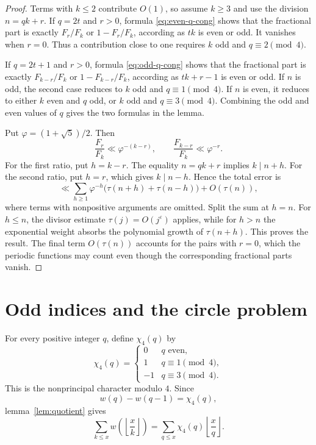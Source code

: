 \documentclass[11pt]{article}
\newcommand{\eps}{\varepsilon}
\begin{document}
\begin{proof}
Terms with $k\leq 2$ contribute $O(1)$, so assume $k\geq 3$ and use
the division $n=qk+r$. If $q=2t$ and $r>0$, formula
\eqref{eq:even-q-cong} shows that the fractional part is exactly
$F_r/F_k$ or $1-F_r/F_k$, according as $tk$ is even or odd. It vanishes
when $r=0$. Thus a contribution close to one requires $k$ odd and
$q\equiv 2\pmod 4$.

If $q=2t+1$ and $r>0$, formula
\eqref{eq:odd-q-cong} shows that the fractional part is exactly
$F_{k-r}/F_k$ or $1-F_{k-r}/F_k$, according as $tk+r-1$ is even or odd.
If $n$ is odd, the second case reduces to $k$ odd and
$q\equiv 1\pmod 4$. If $n$ is even, it reduces to either $k$ even and $q$
odd, or $k$ odd and $q\equiv 3\pmod 4$. Combining the odd and even values
of $q$ gives the two formulas in the lemma.

Put $\varphi=(1+\sqrt5)/2$. Then
\[
 \frac{F_r}{F_k}\ll\varphi^{-(k-r)},\qquad
 \frac{F_{k-r}}{F_k}\ll\varphi^{-r}.
\]
For the first ratio, put $h=k-r$. The equality $n=qk+r$ implies
$k\mid n+h$. For the second ratio, put $h=r$, which gives $k\mid n-h$.
Hence the total error is
\[
 \ll\sum_{h\geq 1}\varphi^{-h}
 \bigl(\tau(n+h)+\tau(n-h)\bigr)+O(\tau(n)),
\]
where terms with nonpositive arguments are omitted. Split the sum at $h=n$.
For $h\leq n$, the divisor estimate $\tau(j)=O(j^\eps)$ applies, while for
$h>n$ the exponential weight absorbs the polynomial growth of
$\tau(n+h)$. This proves the result. The final term $O(\tau(n))$ accounts
for the pairs with $r=0$, which the periodic functions may count even though
the corresponding fractional parts vanish.
\end{proof}

\section{Odd indices and the circle problem}

For every positive integer $q$, define $\chi_4(q)$ by
\[
 \chi_4(q)=
 \begin{cases}
  0&q\text{ even},\\
  1&q\equiv 1\pmod 4,\\
  -1&q\equiv 3\pmod 4.
 \end{cases}
\]
This is the nonprincipal character modulo $4$. Since
\[
 w(q)-w(q-1)=\chi_4(q),
\]
lemma~\ref{lem:quotient} gives
\[
 \sum_{k\leq x}w\left(\left\lfloor\frac{x}{k}\right\rfloor\right)
 =\sum_{q\leq x}\chi_4(q)\left\lfloor\frac{x}{q}\right\rfloor.
\]
\end{document}
